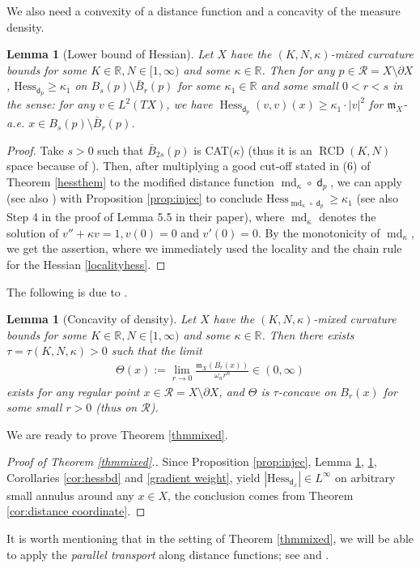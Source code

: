 \documentclass[11pt,reqno]{amsart}
\newtheorem{lemma}[theorem]{Lemma}
\theoremstyle{definition}
\numberwithin{equation}{section}
\newcommand{\dR}{\mathbb{R}}
\newcommand{\fm}{\mathfrak{m}}
\DeclareMathOperator{\dist}{\mathsf{d}}
\DeclareMathOperator{\Hess}{Hess}
\DeclareMathOperator{\RCD}{RCD}
\DeclareMathOperator{\md}{md}
\begin{document}
We also need  a convexity of a distance function and a concavity of the measure density. 
\begin{lemma}
[Lower bound of Hessian]	 \label{l:hessian-lower-bound}
	Let $X$ have the $(K, N, \kappa)$-mixed curvature bounds for some $K \in\dR, N \in [1, \infty)$   
and some
$\kappa \in \mathbb{R}$. Then for any $p \in \mathcal{R}=X\setminus \partial X$, $\mathrm{Hess}_{\dist_p}\ge \kappa_1$ on $B_{s}(p)\setminus \bar B_r(p)$ for some $\kappa_1 \in \mathbb{R}$ and some small $0<r<s$ in the sense: for any $v\in L^2(T X)$, we have
    $
  \Hess_{\dist_p} (v, v)(x) \geq \kappa_1 \cdot |v|^2$ for $\fm_X$-a.e. $x\in B_{s}(p)\setminus \bar B_r(p)$. 
\end{lemma}
\begin{proof}
    Take $s>0$ such that $\bar B_{2s}(p)$ is CAT($\kappa$) (thus it is an $\RCD(K, N)$ space because of \cite[Proposition 7.7]{AMSbe}). Then, after multiplying a good cut-off stated in (6) of Theorem \ref{hessthem} to the modified distance function $\md_{\kappa} \circ \dist_p$,
    we can apply \cite[Remark 2.56 and Theorem 4.7]{Kapovitch-Ketterer-NC} (see also \cite[Theorem 4.14]{CM}) with Proposition \ref{prop:injec} to conclude $\mathrm{Hess}_{\md_{\kappa} \circ \dist_p} \ge \kappa_1$ (see also Step 4 in the proof of Lemma 5.5 in their paper), where $\md_{\kappa}$ denotes the solution of $v''+\kappa v=1, v(0)=0$ and $v'(0)=0$.
    By the monotonicity of $\md_{\kappa}$, we get the assertion, 
    where we immediately used the locality and the chain rule for the Hessian \eqref{localityhess}. 
\end{proof}
The following is 
due to \cite[Theorem 1.3, Proposition 6.8, Corollaries 6.10 and 6.11]{KKK}.
\begin{lemma}[Concavity of density]\label{c:Lipschitz-density}
	Let $X$ have the $(K, N, \kappa)$-mixed curvature bounds for some $K \in \mathbb{R}, N \in [1, \infty)$   
and some
$\kappa \in \mathbb{R}$.  Then there exists $\tau = \tau (K, N, \kappa) > 0$ such that the limit 
	\begin{align}
		\Theta(x) := \lim\limits_{r\to 0} \frac{\fm_X(B_r(x))}{\omega_n r^n}\in (0, \infty)
	\end{align}
	exists for any regular point $x\in \mathcal{R}=X\setminus \partial X$, and $\Theta$ is $\tau$-concave on $B_r(x)$ for some small $r>0$ (thus on $\mathcal{R}$). 
\end{lemma}
We are ready to prove Theorem \ref{thmmixed}.
\begin{proof}[Proof of Theorem \ref{thmmixed}.]
Since Proposition \ref{prop:injec}, Lemma \ref{l:hessian-lower-bound}, \ref{c:Lipschitz-density}, Corollaries \ref{cor:hessbd} and \ref{gradient weight}, yield $|\mathrm{Hess}_{\dist_x}| \in L^{\infty}$ on arbitrary small annulus around any $x \in X$, the conclusion comes from Theorem \ref{cor:distance coordinate}.
\end{proof}
It is worth mentioning that in the setting of Theorem \ref{thmmixed}, we will be able to apply the \textit{parallel transport} along distance functions; see \cite[Theorem 4.12]{GPP} and \cite{GP3}.
\end{document}
